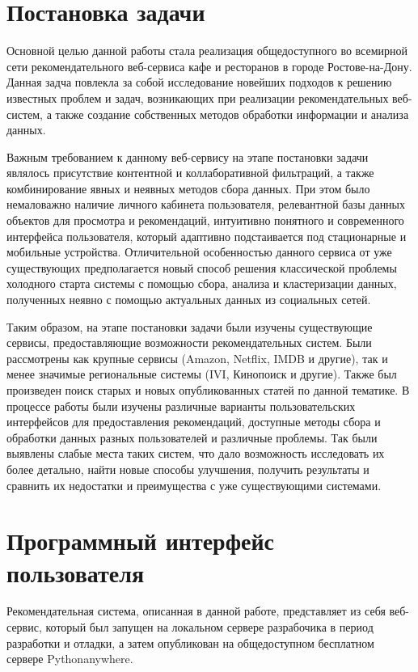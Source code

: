 \section{Постановка задачи}
\label{sec:examples}

Основной целью данной работы стала реализация общедоступного во всемирной сети рекомендательного веб-сервиса кафе и ресторанов в городе Ростове-на-Дону. Данная задча повлекла за собой исследование новейших подходов к решению известных проблем и задач, возникающих при реализации рекомендательных веб-систем, а также создание собственных методов обработки информации и анализа данных.

Важным требованием к данному веб-сервису на этапе постановки задачи являлось присутствие контентной и коллаборативной фильтраций, а также комбинирование явных и неявных методов сбора данных. При этом было немаловажно наличие личного кабинета пользователя, релевантной базы данных объектов для просмотра и рекомендаций, интуитивно понятного и современного интерфейса пользователя, который адаптивно подстаивается под стационарные и мобильные устройства. Отличительной особенностью данного сервиса от уже существующих предполагается новый способ решения классической проблемы холодного старта системы с помощью сбора, анализа и кластеризации данных, полученных неявно с помощью актуальных данных из социальных сетей.

Таким образом, на этапе постановки задачи были изучены существующие сервисы, предоставляющие возможности рекомендательных систем. Были рассмотрены как крупные сервисы (Amazon, Netflix, IMDB и другие), так и менее значимые региональные системы (IVI, Кинопоиск и другие). Также был произведен поиск старых и новых опубликованных статей по данной тематике. В процессе работы были изучены различные варианты пользовательских интерфейсов для предоставления рекомендаций, доступные методы сбора и обработки данных разных пользователей и различные проблемы. Так были выявлены слабые места таких систем, что дало возможность исследовать их более детально, найти новые способы улучшения, получить результаты и сравнить их недостатки и преимущества с уже существующими системами.


\section{Программный интерфейс пользователя}
\label{sec:examples}

Рекомендательная система, описанная в данной работе, представляет из себя веб-сервис, который был запущен на локальном сервере разрабочика в период разработки и отладки, а затем опубликован на общедоступном бесплатном сервере Pythonanywhere.

